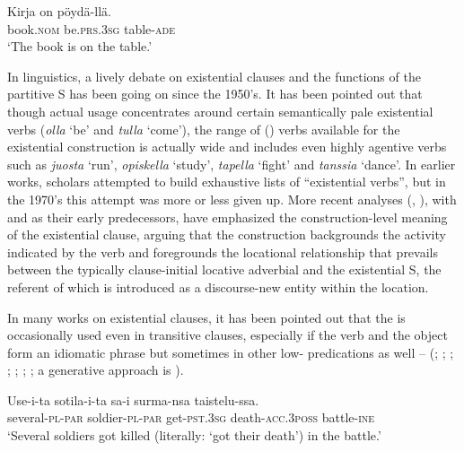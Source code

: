 \documentclass[output=paper]{LSP/langsci}
\begin{document}
\ea\label{15-hu-ex:4}
\gll Kirja on pöydä-llä.\\
book.\textsc{nom} be.\textsc{prs}.\textsc{3sg} table-\textsc{ade}\\
\glt ‘The book is on the table.’
\z

In  linguistics, a lively debate on existential clauses and the functions of the partitive S has been going on since the 1950’s.  It has been pointed out that though actual usage concentrates around certain semantically pale existential verbs (\eg \textit{olla} ‘be’ and \textit{tulla} ‘come’), the range of () verbs available for the existential construction is actually wide and includes even highly agentive verbs such as \textit{juosta} ‘run’, \textit{opiskella} ‘study’, \textit{tapella} ‘fight’ and \textit{tanssia} ‘dance’. In earlier works, scholars attempted to build exhaustive lists of “existential verbs”, but in the 1970’s this attempt was more or less given up. More recent analyses (\eg \citealt{Huumo2003Incremental},  \citealt{Huumoetal2015Subject}), with \citet{Schlachter1958Partitiv} and \citet{Siro1974Eksistentiaalilauseen} as their early predecessors,  have emphasized the construction-level meaning of the existential clause, arguing that the construction backgrounds the activity indicated by the verb and foregrounds the locational relationship that prevails between the typically clause-initial locative adverbial and the existential S, the referent of which is introduced as a discourse-new entity within the location. 

In many works on  existential clauses, it has been pointed out that the  is occasionally used even in transitive clauses, especially if the verb and the object form an idiomatic phrase  but sometimes in other low- predications as well --  (\eg \citealt[77]{Siro1964Suomen}; \citealt{Ikola1972Partitiivi}; \citealt{Saarimaa1967Kielenopas,}; \citealt{Penttil1963Suomen}; \citealt[156–157]{Yli-Vakkuri1979Partitiivisubjektin}; \citealt[167–168]{Hakulinenetal1979Nykysuomen}; \citealt{Sandsetal2001Non-canonical}; a generative approach is \citealt{Nikanne1994Notes}). 

\ea\label{15-hu-ex:5}
\gll Use-i-ta sotila-i-ta sa-i surma-nsa taistelu-ssa.\\
several-\textsc{pl}-\textsc{par} soldier-\textsc{pl}-\textsc{par} get-\textsc{pst}.\textsc{3sg} death-\textsc{acc}.\textsc{3poss} battle-\textsc{ine}\\
\glt ‘Several soldiers got killed (literally: ‘got their death’) in the battle.’
\z
\end{document}
